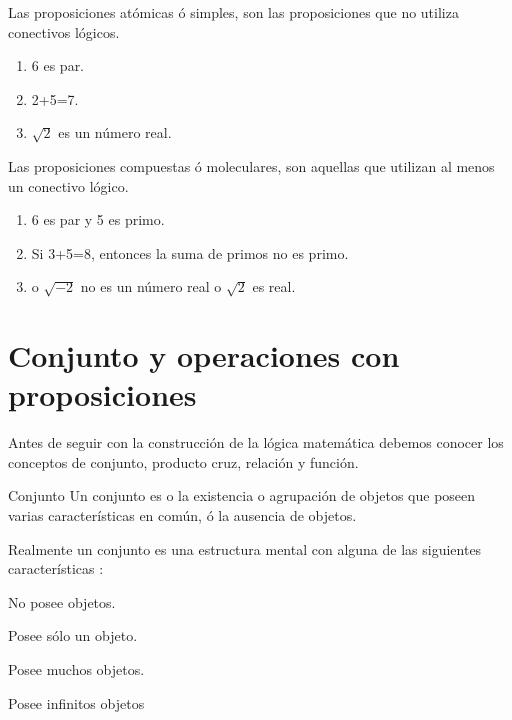 \begin{lista}

\item Las proposiciones atómicas ó simples, son las proposiciones
que no utiliza conectivos lógicos.

\begin{ejems}{}
\begin{enumerate}
\item 6 es par. 
\item 2+5=7. 
\item $\sqrt{2}$ es un número real.
\end{enumerate}
\end{ejems}

\item Las proposiciones compuestas ó moleculares, son aquellas que
utilizan al menos un conectivo lógico.

\begin{ejems}{}
\begin{enumerate}
\item 6 es par y 5 es primo. 
\item Si 3+5=8, entonces la suma de primos no es primo. 
\item o $\sqrt{-2}$ no es un número real o $\sqrt{2}$ es real.
\end{enumerate}
\end{ejems}

\end{lista}


\section{Conjunto y operaciones con proposiciones}

Antes de seguir con la construcción de la lógica matemática debemos
conocer los conceptos de conjunto, producto cruz, relación y función.

\begin{tndefinido}{Conjunto}\textsf{ Un conjunto es o la existencia
o agrupación de objetos que poseen varias características en común,
ó la ausencia de }objetos.\end{tndefinido} 

Realmente un conjunto es una estructura mental con alguna de las siguientes
características :

\begin{lista}

\item  No posee objetos.

\item  Posee sólo un objeto.

\item  Posee muchos objetos.

\item  Posee infinitos objetos

\end{lista}

